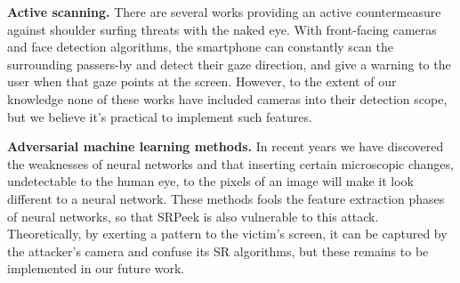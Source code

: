 \vspace{1mm}
\noindent
\textbf{Active scanning.} There are several works providing an active countermeasure against shoulder surfing threats with the naked eye. With front-facing cameras and face detection algorithms, the smartphone can constantly scan the surrounding passers-by and detect their gaze direction, and give a warning to the user when that gaze points at the screen. However, to the extent of our knowledge none of these works have included cameras into their detection scope, but we believe it's practical to implement such features.

\vspace{1mm}
\noindent
\textbf{Adversarial machine learning methods.} In recent years we have discovered the weaknesses of neural networks and that inserting certain microscopic changes, undetectable to the human eye, to the pixels of an image will make it look different to a neural network. These methods fools the feature extraction phases of neural networks, so that SRPeek is also vulnerable to this attack. Theoretically, by exerting a pattern to the victim's screen, it can be captured by the attacker's camera and confuse its SR algorithms, but these remains to be implemented in our future work.